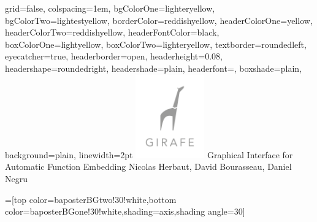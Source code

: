 \documentclass[portrait,final,a0paper]{baposter}
\begin{document}
\newlength{\leftimgwidth}
\begin{poster}%
  {
  grid=false,
  colspacing=1em,
  bgColorOne=lighteryellow,
  bgColorTwo=lightestyellow,
  borderColor=reddishyellow,
  headerColorOne=yellow,
  headerColorTwo=reddishyellow,
  headerFontColor=black,
  boxColorOne=lightyellow,
  boxColorTwo=lighteryellow,
  textborder=roundedleft,
  eyecatcher=true,
  headerborder=open,
  headerheight=0.08\textheight,
  headershape=roundedright,
  headershade=plain,
  headerfont=\Large\textsf, %
  boxshade=plain,
  background=plain,
  linewidth=2pt
  }
  {\includegraphics[width=8em]{Giraffe-icon.png}} %
  {\sf %
   Graphical Interface for Automatic Function Embedding}
  {\sf %
  \vspace{0.5em}
  Nicolas Herbaut, David Bourasseau, Daniel Negru
  }
    
    
  

  =[top color=baposterBGtwo!30!white,bottom color=baposterBGone!30!white,shading=axis,shading angle=30]

     \setlength{\leftimgwidth}{0.78em+8.0em}

    \newcommand{\colouredcircle}[1]{%
      \tikz{\useasboundingbox (-0.2em,-0.32em) rectangle(0.2em,0.32em); \draw[draw=black,fill=baposterBGone!80!black!#1!white,line width=0.03em] (0,0) circle(0.18em);}}



\end{poster}
\end{document}
